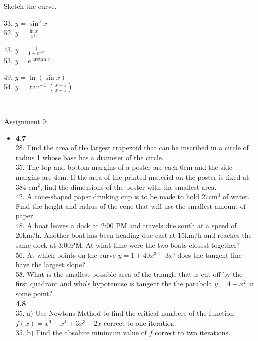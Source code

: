 \documentclass{letter}
\begin{document}
\begin{itemize}
		Sketch the curve.\\
		\begin{minipage}[t]{0.3\textwidth}
			33. $y = \sin^3 x$\\
			52. $y = \frac{\ln x}{x^2}$
		\end{minipage}
		\begin{minipage}[t]{0.3\textwidth}
			43. $y = \frac{1}{1+e^{-x}}$\\
			53. $y = e^{\arctan x}$
		\end{minipage}
		\begin{minipage}[t]{0.3\textwidth}
			49. $y = \ln(\sin x)$\\
			54. $y = \tan^{-1}(\frac{x-1}{x+1})$
		\end{minipage}\\
	\end{itemize}
	\clearpage
	\large\underline{\textbf Assignment 9:}
	\begin{itemize}
		\item[] \textbf{4.7}\\
		
		28. Find the area of the largest trapezoid that can be inscribed in a circle of radius 1 whose base has a diameter of the circle.\\
		
		35. The top and bottom margins of a poster are each 6cm and the side margins are 4cm. If the area of the printed material on the poster is fixed at 384 cm$^2$, find the dimensions of the poster with the smallest area.\\
		
		42. A cone-shaped paper drinking cup is to be made to hold 27cm$^3$ of water. Find the height and radius of the cone that will use the smallest amount of paper.\\
		
		48. A boat leaves a dock at 2:00 PM and travels due south at a speed of 20km/h. Another boat has been heading due east at 15km/h and reaches the same dock at 3:00PM. At what time were the two boats closest together?\\
		
		56. At which points on the curve $y=1 + 40x^3 - 3x^5$ does the tangent line have the largest slope?\\
		
		58. What is the smallest possible area of the triangle that is cut off by the first quadrant and who's hypotenuse is tangent the the parabola $y = 4 - x^2$ at some point?\\
		
		\textbf{4.8}\\
		
		35. a) Use Newtons Method to find the critical numbers of the function $f(x) = x^6 - x^4 + 3x^3 - 2x$ correct to one iteration.\\
		35. b) Find the absolute minimum value of $f$ correct to two iterations.
	\end{itemize}
\end{document}
